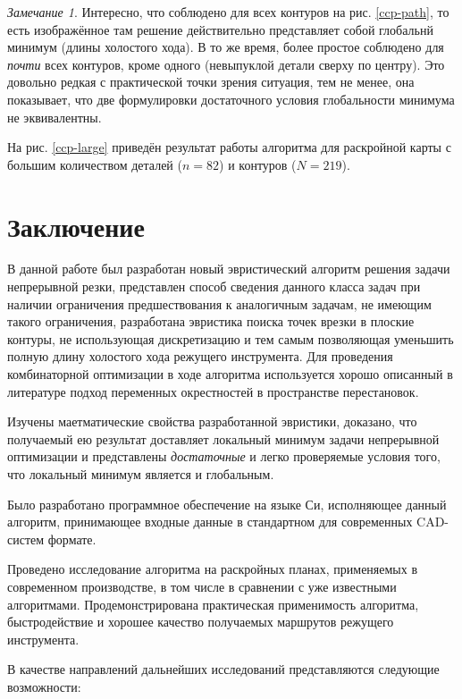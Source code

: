 \documentclass[14pt]{extarticle}
\theoremstyle{plain}%
\theoremstyle{remark}
\newtheorem{remark}{Замечание}
\begin{document}
\begin{remark}
  Интересно,
  что
  соблюдено для всех контуров
  на рис. \ref{ccp-path},
  то есть изображённое там решение
  действительно представляет собой
  глобальнй минимум
  (длины холостого хода).
  В то же время,
  более простое
  соблюдено для
  \textit{почти}
  всех контуров,
  кроме одного
  (невыпуклой детали сверху по центру).
  Это довольно редкая
  с практической точки зрения ситуация,
  тем не менее,
  она показывает,
  что две формулировки
  достаточного условия
  глобальности минимума
  не эквивалентны.
\end{remark}

На рис. \ref{ccp-large}
приведён
результат работы алгоритма
для раскройной карты с большим количеством
деталей
($n=82$)
и контуров
($N=219$).

\section{Заключение}

В данной работе был разработан
новый эвристический алгоритм решения
задачи непрерывной резки,
представлен способ
сведения данного класса задач
при наличии ограничения предшествования
к аналогичным задачам,
не имеющим такого ограничения,
разработана эвристика
поиска точек врезки в плоские контуры,
не использующая дискретизацию
и тем самым позволяющая уменьшить
полную длину холостого хода
режущего инструмента.
Для проведения комбинаторной оптимизации
в ходе алгоритма используется
хорошо описанный в литературе
подход переменных окрестностей
в пространстве перестановок.

Изучены маетматические свойства разработанной эвристики,
доказано,
что получаемый ею результат
доставляет локальный минимум
задачи непрерывной оптимизации
и представлены
\textit{достаточные}
и легко проверяемые
условия того,
что локальный минимум
является и глобальным.

Было разработано программное обеспечение на языке Си,
исполняющее данный алгоритм,
принимающее входные данные в стандартном
для современных CAD-систем формате.

Проведено исследование алгоритма
на раскройных планах,
применяемых в современном производстве,
в том числе в сравнении с уже
известными алгоритмами.
Продемонстрирована практическая применимость алгоритма,
быстродействие и хорошее качество
получаемых маршрутов режущего инструмента.

В качестве направлений дальнейших исследований
представляются следующие возможности:
\end{document}
